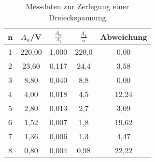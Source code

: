 
\begin{table}[h!]
  \centering
  \caption{Messdaten zur Zerlegung einer Dreieckspannung}
  \label{tab:dreieck}
  \begin{tabular}{c c c c c}
    \toprule
    n & $A_n$/V & $\frac{A_{n}}{A_{1}}$ & $\frac{A_1}{n}$ & Abweichung\\
    \midrule

    1 & 220,00  & 1,000         &  220,0	   &  0,00 \\
    2 & 23,60   & 0,117 &  24,4	 &  3,58 \\
    3 & 8,80    & 0,040         &  8,8	   &  0,00 \\
    4 & 4,00    & 0,018 &  4,5	   &  12,24 \\
    5 & 2,80    & 0,013 &  2,7	   &  3,09 \\
    6 & 1,52    & 0,007 &  1,8	   &  19,62 \\
    7 & 1,36    & 0,006 &  1,3	   &  4,47 \\
    8 & 0,80    & 0,004 &  0,98	 &  22,22 \\




    \bottomrule
  \end{tabular}
\end{table}
